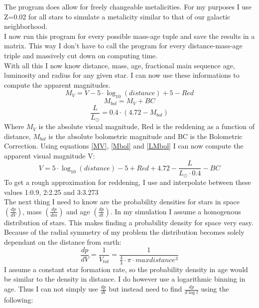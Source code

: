\documentclass[a4paper,10pt]{article}
\begin{document}
 The program does allow for freely changeable metalicities. For my purposes I use Z=0.02 for all stars to simulate
 a metalicity similar to that of our galactic neighborhood.\\
 I now run this program for every possible mass-age tuple and save the results in a matrix. This way I don't have to call the program for
 every distance-mass-age triple and massively cut down on computing time.\\
 With all this I now know distance, mass, age, fractional main sequence age, luminosity and radius for any given star. I can now use these 
 informations to compute the apparent magnitudes.
 \begin{equation}
  M_{V}=V-5\cdot\log_{10}(distance)+5-Red
  \label{MV}
 \end{equation}
 \begin{equation}
  M_{bol}=M_{V}+BC
  \label{Mbol}
 \end{equation}
 \begin{equation}
  \frac{L}{L_\odot}=0.4\cdot(4.72-M_{bol})
  \label{LMbol}
 \end{equation}
 Where $M_{V}$ is the absolute visual magnitude, Red is the reddening as a function of distance, $M_{bol}$ is the absolute bolometric 
 magnitude and BC is the Bolometric Correction. Using equations \ref{MV}, \ref{Mbol} and \ref{LMbol} I can now compute the apparent visual
 magnitude V:
 \begin{equation}
  V=5\cdot\log_{10}(distance)-5+Red+4.72-\frac{L}{L_\odot\cdot0.4}-BC
 \end{equation}
 To get a rough approximation for reddening, I use \citet*[Figure 9]{2005AJ....130..659A} and interpolate between these values 
 1:0.9, 2:2.25 and 3:3.273\\
 The next thing I need to know are the probability densities for stars in space $\left(\frac{dp}{dV}\right)$, mass 
 $\left(\frac{dp}{dm}\right)$ and age $\left(\frac{dp}{dt}\right)$. In my simulation I assume a homogenous distribution of stars. 
 This makes finding a probability density for space very easy. Because of the radial symmetry of my problem the distribution becomes
 solely dependant on the distance from earth:
 \begin{equation}
  \frac{dp}{dV}=\frac{1}{V_{tot}}=\frac{1}{\frac43\cdot\pi\cdot maxdistance^3}
  \label{dpdV}
 \end{equation}
 I assume a constant star formation rate, so the probability density in age would be similar to the density in distance. I do however use
 a logarithmic binning in age. Thus I can not simply use $\frac{dp}{dt}$ but instead need to find $\frac{dp}{d\log t}$ using the following:
\end{document}
